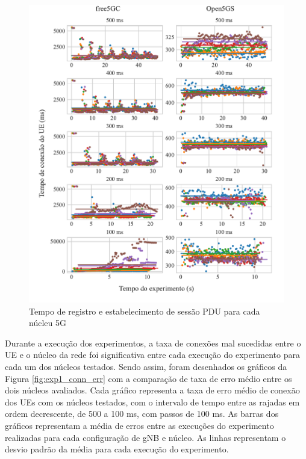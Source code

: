 \begin{figure}[H]
    \centering
    \includegraphics[width=1.05\textwidth]{TG2/Chapters/DataAnalysis/Figures/EXP1-CONN-12C-8GB.pdf}
    \caption{Tempo de registro e estabelecimento de sessão PDU para cada núcleu 5G}
    \label{fig:exp1_conn}
\end{figure}

Durante a execução dos experimentos, a taxa de conexões mal sucedidas entre o UE e o núcleo da rede foi significativa entre cada execução do experimento para cada um dos núcleos testados. Sendo assim, foram desenhados os gráficos da Figura \ref{fig:exp1_conn_err} com a comparação de taxa de erro médio entre os dois núcleos avaliados.
Cada gráfico representa a taxa de erro médio de conexão dos UEs com os núcleos testados, com o intervalo de tempo entre as rajadas em ordem decrescente, de 500 a 100 ms, com passos de 100 ms.
As barras dos gráficos representam a média de erros entre as execuções do experimento realizadas para cada configuração de gNB e núcleo. As linhas representam o desvio padrão da média para cada execução do experimento.


